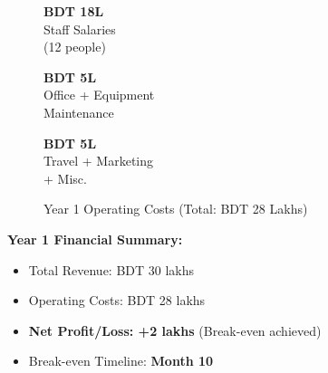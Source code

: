 \begin{figure}[H]
    \centering
    \noindent
    \begin{minipage}[t]{0.32\textwidth}
        \begin{tcolorbox}[colback=BoxBlue,colframe=SecondaryBlue,arc=5pt,boxrule=1pt,
            halign=center,top=6pt,bottom=6pt]
            {\large\bfseries\color{PrimaryBlue}BDT 18L}\\[2pt]
            {\small\color{DarkGrey}Staff Salaries\\(12 people)}
        \end{tcolorbox}
    \end{minipage}\hfill
    \begin{minipage}[t]{0.32\textwidth}
        \begin{tcolorbox}[colback=BoxBlue,colframe=SecondaryBlue,arc=5pt,boxrule=1pt,
            halign=center,top=6pt,bottom=6pt]
            {\large\bfseries\color{PrimaryBlue}BDT 5L}\\[2pt]
            {\small\color{DarkGrey}Office + Equipment\\Maintenance}
        \end{tcolorbox}
    \end{minipage}\hfill
    \begin{minipage}[t]{0.32\textwidth}
        \begin{tcolorbox}[colback=BoxBlue,colframe=SecondaryBlue,arc=5pt,boxrule=1pt,
            halign=center,top=6pt,bottom=6pt]
            {\large\bfseries\color{PrimaryBlue}BDT 5L}\\[2pt]
            {\small\color{DarkGrey}Travel + Marketing\\+ Misc.}
        \end{tcolorbox}
    \end{minipage}
    \caption{Year 1 Operating Costs (Total: BDT 28 Lakhs)}
    \label{tab:year1_costs}
\end{figure}

\textbf{Year 1 Financial Summary:}
\begin{itemize}
    \item Total Revenue: BDT 30 lakhs
    \item Operating Costs: BDT 28 lakhs
    \item \textcolor{AccentGreen}{\textbf{Net Profit/Loss: +2 lakhs}} (Break-even achieved)
    \item Break-even Timeline: \textcolor{AccentGreen}{\textbf{Month 10}}
\end{itemize}

